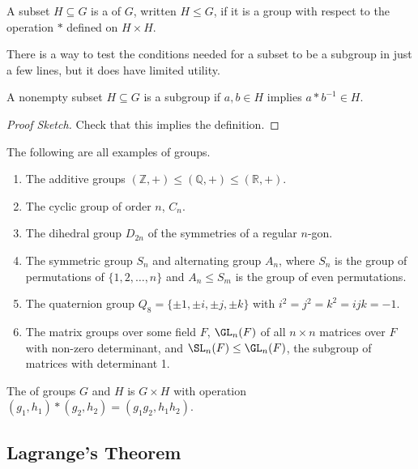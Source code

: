 \documentclass[a4paper]{scrartcl}
\begin{document}
\begin{definition}[Subgroup]
	A subset $H \subseteq G$ is a  of $G$, written $H \leq G$, if it is a group with respect to the operation $*$ defined on $H \times H$.
\end{definition}

There is a way to test the conditions needed for a subset to be a subgroup in just a few lines, but it does have limited utility.

\begin{lemma}
A nonempty subset $H \subseteq G$ is a subgroup if $a, b \in H$ implies $a * b^{-1} \in H$.
\end{lemma}
\begin{proof}[Proof Sketch]
	Check that this implies the definition.
\end{proof}

\begin{example}
	The following are all examples of groups.
	\begin{enumerate}[label=(\roman*)]
		\item The additive groups $(\mathbb{Z}, +) \leq (\mathbb{Q}, +) \leq (\mathbb{R}, +)$.
		\item The cyclic group of order $n$, $C_n$.
		\item The dihedral group $D_{2n}$ of the symmetries of a regular $n$-gon.
		\item The symmetric group $S_n$ and alternating group $A_n$, where $S_n$ is the group of permutations of $\{1, 2, \dots, n\}$ and $A_n \leq S_m$ is the group of even permutations. 
		\item The quaternion group $Q_8 = \{\pm 1, \pm i, \pm j, \pm k \}$ with $i^2 = j^2 = k^2 = ijk = -1$.
		\item The matrix groups over some field $F$, $\GL_n(F)$ of all $n \times n$ matrices over $F$ with non-zero determinant, and $\SL_n(F) \leq \GL_n(F)$, the subgroup of matrices with determinant 1.
	\end{enumerate}
\end{example}

\begin{definition}
	The  of groups $G$ and $H$ is $G \times H$ with operation $(g_1, h_1) * (g_2, h_2) = (g_1 g_2, h_1 h_2)$. 
\end{definition}

\subsection{Lagrange's Theorem}
\end{document}
